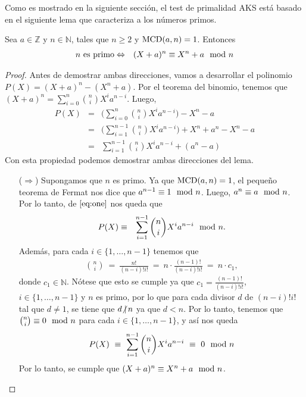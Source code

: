         Como es mostrado en la siguiente sección, el test de
        primalidad AKS está basado en el siguiente lema que
        caracteriza a los números primos.
	\begin{lemma}\label{lem-2.1}
		Sea $a\in \mathbb{Z}$ y $n \in \mathbb{N}$, tales que $n\geq 2$ y ${\rm MCD}(a,n)=1$. Entonces
		\begin{eqnarray*}
			n \text{ es primo} & \Leftrightarrow & (X+a)^n \equiv X^n+a \mod n
		\end{eqnarray*}
	\end{lemma}
	\begin{proof}
		Antes de demostrar ambas direcciones, vamos a desarrollar el polinomio $P(X)=(X+a)^n - (X^n+a)$. 
Por el teorema del binomio, tenemos que $(X+a)^n=\sum_{i=0}^{n}{n\choose i}X^i a^{n-i}$. Luego,
		\begin{eqnarray}
			P(X) &=&  \bigg(\sum_{i=0}^{n}{n\choose i}X^i a^{n-i}\bigg)-X^n -a \nonumber\\ 
			&=&  \bigg(\sum_{i=1}^{n-1}{n\choose i}X^i a^{n-i}\bigg) + X^n + a^n -X^n -a\nonumber\\
			&=&  \sum_{i=1}^{n-1}{n\choose i}X^i a^{n-i} + (a^n -a) \label{eq:one}
		\end{eqnarray}		 
Con esta propiedad podemos demostrar ambas direcciones del lema. 
\begin{itemize}
\item[($\Rightarrow$)]
			Supongamos que $n$ es primo. Ya que ${\rm MCD}(a,n)=1$, el pequeño teorema de Fermat nos dice que $a^{n-1}\equiv 1  \mod n$. Luego, $a^n\equiv a \mod n$. Por lo tanto, de $\eqref{eq:one}$ nos queda que
			\begin{eqnarray*}
				P(X) &\equiv  & \sum_{i=1}^{n-1}{n\choose i}X^i a^{n-i} \modl n. %
			\end{eqnarray*} 
			Además, 
			para cada $i \in \{1, \ldots, n-1\}$ tenemos que
			\begin{eqnarray*}
				{n\choose i} \ = \ \frac{n!}{(n-i)!i!} \ = \ n\cdot \frac{(n-1)!}{(n-i)!i!} \ = \ n\cdot c_1, 
			\end{eqnarray*}
			donde $c_1 \in \mathbb{N}$. 
			Nótese que esto se cumple ya que $c_1=\frac{(n-1)!}{(n-i)!i!}$, $i \in \{1, \ldots, n-1\}$ y $n$ es primo, por lo que para cada divisor $d$ de $(n-i)! i!$ tal que $d \neq 1$, se tiene que $d \text{$\not|$}\hspace{1.8pt} n$ ya que $d < n$. 
			 Por lo tanto, tenemos que ${n\choose i} \equiv 0 \mod n$ para cada $i \in \{1, \ldots, n-1\}$, y así nos queda
			\begin{eqnarray*}
				P(X) \ \equiv \ \sum_{i=1}^{n-1}{n\choose i}X^i a^{n-i} \ \equiv \ 0 \mod n
			\end{eqnarray*}
			Por lo tanto, se cumple que $(X+a)^n \equiv X^n+a \mod n$.
		

\end{itemize}
\end{proof}
